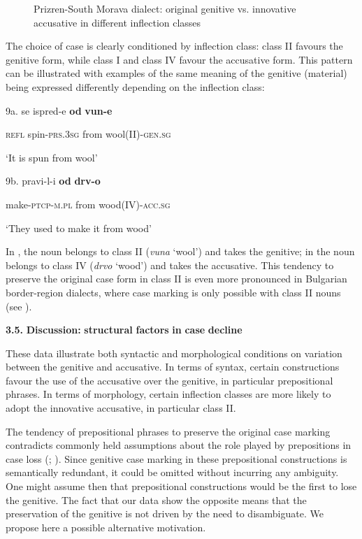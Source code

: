 \documentclass[output=paper]{langscibook}
\begin{document}
\begin{figure}
\caption{Prizren-South Morava dialect: original genitive vs. innovative accusative in different inflection classes}
\label{fig:key:4}
\end{figure}

The choice of case is clearly conditioned by inflection class: class II favours the genitive form, while class I and class IV favour the accusative form. This pattern can be illustrated with examples of the same meaning of the genitive (material) being expressed differently depending on the inflection class:

9a.   se         ispred-e            \textbf{od}                   \textbf{vun-e}

\textbf{  }  \textsc{refl}      spin-\textsc{prs.3sg}   from           wool(II)-\textsc{gen.sg}

       ‘It is spun from wool’

9b. pravi-l-i             \textbf{od}          \textbf{drv-o}

      make-\textsc{ptcp-m.pl}  from    wood(IV)\textsc{{}-acc.sg}

      ‘They used to make it from wood’

In , the noun belongs to class II (\textit{vuna} ‘wool’) and takes the genitive; in  the noun belongs to class IV (\textit{drvo} ‘wood’) and takes the accusative.  This tendency to preserve the original case form in class II is even more pronounced in Bulgarian border-region dialects, where case marking is only possible with class II nouns (see ).

\textbf{3.5.} \textbf{Discussion:} \textbf{structural} \textbf{factors} \textbf{in} \textbf{case} \textbf{decline}

These data illustrate both syntactic and morphological conditions on variation between the genitive and accusative. In terms of syntax, certain constructions favour the use of the accusative over the genitive, in particular prepositional phrases. In terms of morphology, certain inflection classes are more likely to adopt the innovative accusative, in particular class II. 

The tendency of prepositional phrases to preserve the original case marking contradicts commonly held assumptions about the role played by prepositions in case loss (\citealt{Blake2004}; \citealt{HewsonBubenik2006}). Since genitive case marking in these prepositional constructions is semantically redundant, it could be omitted without incurring any ambiguity. One might assume then that prepositional constructions would be the first to lose the genitive. The fact that our data show the opposite means that the preservation of the genitive is not driven by the need to disambiguate. We propose here a possible alternative motivation.
\end{document}
